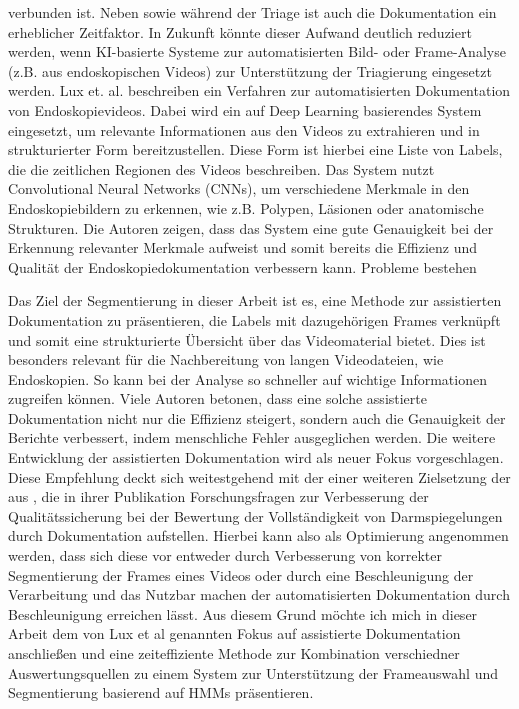 verbunden ist. \cite{savides2025triaging} Neben sowie während der Triage ist auch die Dokumentation ein erheblicher Zeitfaktor. In Zukunft könnte dieser Aufwand deutlich reduziert werden, wenn KI-basierte Systeme zur automatisierten Bild- oder Frame-Analyse (z.B. aus endoskopischen Videos) zur Unterstützung der Triagierung eingesetzt werden.\newline 
Lux et. al. beschreiben ein Verfahren zur automatisierten Dokumentation von Endoskopievideos.\cite{lux-2023} Dabei wird ein auf Deep Learning basierendes System eingesetzt, um relevante Informationen aus den Videos zu extrahieren und in strukturierter Form bereitzustellen. Diese Form ist hierbei eine Liste von Labels, die die zeitlichen Regionen des Videos beschreiben. Das System nutzt Convolutional Neural Networks (CNNs), um verschiedene Merkmale in den Endoskopiebildern zu erkennen, wie z.B. Polypen, Läsionen oder anatomische Strukturen. Die Autoren zeigen, dass das System eine gute Genauigkeit bei der Erkennung relevanter Merkmale aufweist und somit bereits die Effizienz und Qualität der Endoskopiedokumentation verbessern kann. Probleme bestehen

Das Ziel der Segmentierung in dieser Arbeit ist es, eine Methode zur assistierten Dokumentation zu präsentieren, die Labels mit dazugehörigen Frames verknüpft und somit eine strukturierte Übersicht über das Videomaterial bietet. Dies ist besonders relevant für die Nachbereitung von langen Videodateien, wie Endoskopien. So kann bei der Analyse so schneller auf wichtige Informationen zugreifen können. Viele Autoren betonen, dass eine solche assistierte Dokumentation nicht nur die Effizienz steigert, sondern auch die Genauigkeit der Berichte verbessert, indem menschliche Fehler ausgeglichen werden. Die weitere Entwicklung der assistierten Dokumentation wird als neuer Fokus vorgeschlagen. Diese Empfehlung deckt sich weitestgehend mit der einer weiteren Zielsetzung der  aus \cite{kaminski-performance-2017}, die in ihrer Publikation Forschungsfragen zur Verbesserung der Qualitätssicherung bei der Bewertung der Vollständigkeit von Darmspiegelungen durch Dokumentation aufstellen. Hierbei kann also als Optimierung angenommen werden, dass sich diese vor entweder durch Verbesserung von korrekter Segmentierung der Frames eines Videos oder durch eine Beschleunigung der Verarbeitung und das Nutzbar machen der automatisierten Dokumentation durch Beschleunigung erreichen lässt. Aus diesem Grund möchte ich mich in dieser Arbeit dem von Lux et al genannten Fokus auf assistierte Dokumentation anschließen und eine zeiteffiziente Methode zur Kombination verschiedner Auswertungsquellen zu einem System zur Unterstützung der Frameauswahl und Segmentierung basierend auf HMMs präsentieren. 


